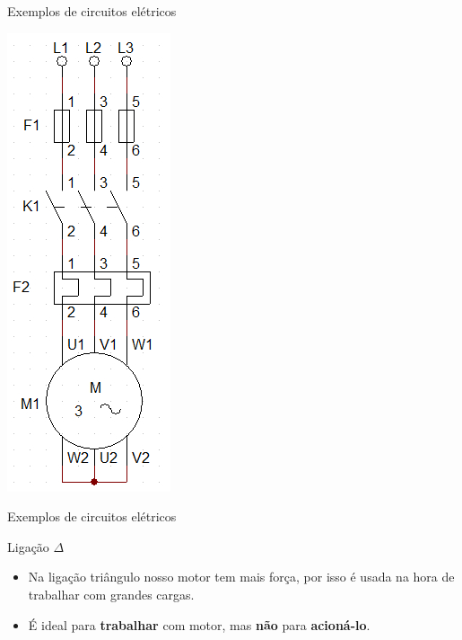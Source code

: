 \begin{frame}{Exemplos de circuitos elétricos}
\centerline{\includegraphics[height=0.9\textheight]{Figuras/Ch07/fig18.jpg}}
\end{frame}


\begin{frame}{Exemplos de circuitos elétricos}
\begin{block}{Ligação $ \Delta $}
\begin{itemize}
    \item Na ligação triângulo nosso motor tem mais força, por isso é usada na hora de trabalhar com grandes cargas.
    \item É ideal para \textbf{trabalhar} com motor, mas \textbf{não} para \textbf{acioná-lo}.
\end{itemize}
\end{block}
\end{frame}


